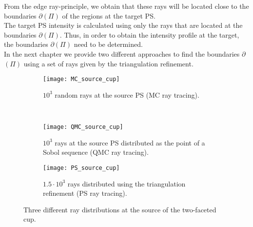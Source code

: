 From the edge ray-principle, we obtain that these rays will be located close to the boundaries $\partial$$(\Pi)$ of the regions at the target PS.
\\ \indent The target PS intensity is calculated using only the rays that are located at the boundaries $\partial$$(\Pi)$. Thus, in order to obtain the intensity profile at the target, the boundaries $\partial$$(\Pi)$ need to be determined.\\ \indent 
In the next chapter we provide two different approaches to find the boundaries $\partial$$(\Pi)$ using a set of rays given by the triangulation refinement.
\begin{figure}[h]
 \begin{subfigure}[t]{\textwidth}
\centering
    \texttt{[image: MC\_source\_cup]}
    \caption{$10^3$ random rays at the source PS (MC ray tracing).}
    \label{fig:mc_sample}
\end{subfigure}
\hfill
\\
\begin{subfigure}[t]{\textwidth}
\centering
    \texttt{[image: QMC\_source\_cup]}
    \caption{$10^3$ rays at the source PS distributed as the point of a Sobol sequence (QMC ray tracing).}
    \label{fig:qmc_sample}
\end{subfigure}
\hfill
\begin{subfigure}[t]{\textwidth}
\centering
\texttt{[image: PS\_source\_cup]}
\caption{$1.5\cdot10^3$ rays distributed using the triangulation refinement (PS ray tracing).}
\label{fig:ps_sample}
\end{subfigure}
\caption{Three different ray distributions at the source of the two-faceted cup.}
\label{fig:three_distributions}
\end{figure}

